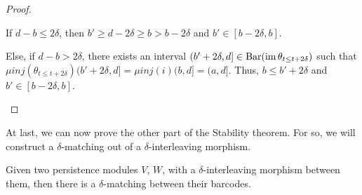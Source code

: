 \begin{proof}
\begin{enumerate}
    If $ d-b \leq 2 \delta $, then $ b' \geq d - 2\delta \geq b > b -2 \delta $ and $ b' \in [b - 2 \delta, b] $.

    Else, if $ d-b > 2 \delta $, there exists an interval $ (b' + 2\delta, d] \in \operatorname{Bar}(\operatorname{im} \theta_{t \leq t+2\delta}) $ such that $\mu{inj}(\theta_{t \leq t+2\delta})(b' + 2\delta, d] = \mu{inj}(i)(b, d] = (a,d]$. Thus, $ b \leq b' + 2\delta $ and $ b' \in [b - 2 \delta, b] $.
\end{enumerate}
\end{proof}

At last, we can now prove the other part of the Stability theorem. For so, we will construct a $\delta$-matching out of a $\delta$-interleaving morphism.

\begin{proposition} \cite[Theorem 3.0.2]{polterovich} \label{prop:matching-if-interleaving}
    Given two persistence modules $ V $, $ W $, with a $\delta$-interleaving morphism between them, then there is a $ \delta$-matching between their barcodes.
\end{proposition}
